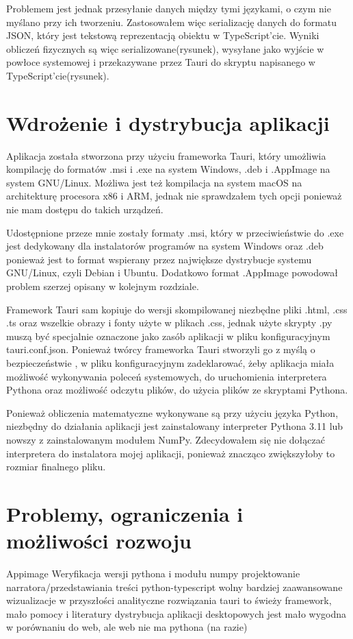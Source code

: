 \documentclass{SGGW-thesis}
\begin{document}
		Problemem jest jednak przesyłanie danych między tymi językami, o czym nie myślano przy ich tworzeniu. Zastosowałem więc serializację danych do formatu JSON, który jest tekstową reprezentacją obiektu w TypeScript'cie. Wyniki obliczeń fizycznych są więc serializowane(rysunek), wysyłane jako wyjście w powłoce systemowej i przekazywane przez Tauri do skryptu napisanego w TypeScript'cie(rysunek).  
	\section{Wdrożenie i dystrybucja aplikacji}
	Aplikacja została stworzona przy użyciu frameworka Tauri, który umożliwia kompilację do formatów .msi i .exe na system Windows, .deb i .AppImage na system GNU/Linux. Możliwa jest też kompilacja na system macOS na architekturę procesora x86 i ARM, jednak nie sprawdzałem tych opcji ponieważ nie mam dostępu do takich urządzeń.
	
	Udostępnione przeze mnie zostały formaty .msi, który w przeciwieństwie do .exe jest dedykowany dla instalatorów programów na system Windows oraz .deb ponieważ jest to format wspierany przez największe dystrybucje systemu GNU/Linux, czyli Debian i Ubuntu. Dodatkowo format .AppImage powodował problem szerzej opisany w kolejnym rozdziale. 
	
	Framework Tauri sam kopiuje do wersji skompilowanej niezbędne pliki .html, .css .ts oraz wszelkie obrazy i fonty użyte w plikach .css, jednak użyte skrypty .py muszą być specjalnie oznaczone jako zasób aplikacji w pliku konfiguracyjnym tauri.conf.json. Ponieważ twórcy frameworka Tauri stworzyli go z myślą o bezpieczeństwie \cite{tauri-security}, w pliku konfiguracyjnym zadeklarować, żeby aplikacja miała możliwość wykonywania poleceń systemowych, do uruchomienia interpretera Pythona oraz możliwość odczytu plików, do użycia plików ze skryptami Pythona.
	
	Ponieważ obliczenia matematyczne wykonywane są przy użyciu języka Python, niezbędny do działania aplikacji jest zainstalowany interpreter Pythona 3.11 lub nowszy z zainstalowanym modułem NumPy. Zdecydowałem się nie dołączać interpretera do instalatora mojej aplikacji, ponieważ znacząco zwiększyłoby to rozmiar finalnego pliku. 
	\section{Problemy, ograniczenia i możliwości rozwoju}
	Appimage
	Weryfikacja wersji pythona i modułu numpy
	projektowanie narratora/przedstawiania treści
	python-typescript wolny
	bardziej zaawansowane wizualizacje w przyszłości
	analityczne rozwiązania
	tauri to świeży framework, mało pomocy i literatury
	dystrybucja aplikacji desktopowych jest mało wygodna w porównaniu do web, ale web nie ma pythona (na razie)
	
\end{document}
